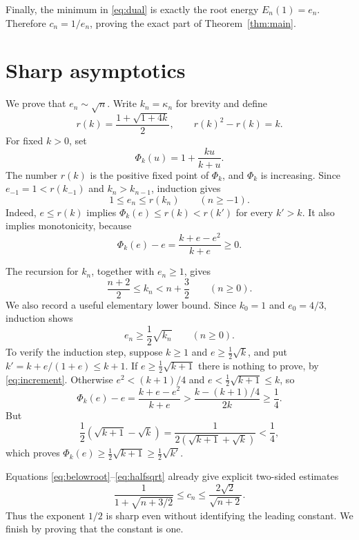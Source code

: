 \documentclass[11pt]{article}
\begin{document}
Finally, the minimum in \eqref{eq:dual} is exactly the root energy
$E_n(1)=e_n$.  Therefore $c_n=1/e_n$, proving the exact part of
Theorem~\ref{thm:main}.

\section{Sharp asymptotics}

We prove that $e_n\sim\sqrt n$.  Write $k_n=\kappa_n$ for brevity and define
\[
 r(k)=\frac{1+\sqrt{1+4k}}2,
 \qquad r(k)^2-r(k)=k.
\]
For fixed $k>0$, set
\[
 \Phi_k(u)=1+\frac{ku}{k+u}.
\]
The number $r(k)$ is the positive fixed point of $\Phi_k$, and $\Phi_k$ is
increasing.  Since $e_{-1}=1<r(k_{-1})$ and $k_n>k_{n-1}$, induction gives
\begin{equation}\label{eq:belowroot}
 1\le e_n\le r(k_n)\qquad(n\ge-1).
\end{equation}
Indeed, $e\le r(k)$ implies
$\Phi_k(e)\le r(k)<r(k')$ for every $k'>k$.  It also implies monotonicity,
because
\begin{equation}\label{eq:increment}
 \Phi_k(e)-e=\frac{k+e-e^2}{k+e}\ge0.
\end{equation}

The recursion for $k_n$, together with $e_n\ge1$, gives
\begin{equation}\label{eq:kbounds}
 \frac{n+2}{2}\le k_n<n+\frac32
 \qquad(n\ge0).
\end{equation}
We also record a useful elementary lower bound.  Since
$k_0=1$ and $e_0=4/3$, induction shows
\begin{equation}\label{eq:halfsqrt}
 e_n\ge\frac12\sqrt{k_n}\qquad(n\ge0).
\end{equation}
To verify the induction step, suppose $k\ge1$ and
$e\ge\tfrac12\sqrt k$, and put
$k'=k+e/(1+e)\le k+1$.  If
$e\ge\tfrac12\sqrt{k+1}$ there is nothing to prove, by
\eqref{eq:increment}.  Otherwise $e^2<(k+1)/4$ and
$e<\tfrac12\sqrt{k+1}\le k$, so
\[
 \Phi_k(e)-e
 =\frac{k+e-e^2}{k+e}
 >\frac{k-(k+1)/4}{2k}\ge\frac14.
\]
But
\[
 \frac12(\sqrt{k+1}-\sqrt k)
 =\frac1{2(\sqrt{k+1}+\sqrt k)}<\frac14,
\]
which proves $\Phi_k(e)\ge\tfrac12\sqrt{k+1}\ge
\tfrac12\sqrt{k'}$.

Equations \eqref{eq:belowroot}--\eqref{eq:halfsqrt} already give explicit
two-sided estimates
\begin{equation}\label{eq:explicit}
 \frac1{1+\sqrt{n+3/2}}
 \le c_n\le\frac{2\sqrt2}{\sqrt{n+2}}.
\end{equation}
Thus the exponent $1/2$ is sharp even without identifying the leading
constant.  We finish by proving that the constant is one.
\end{document}
